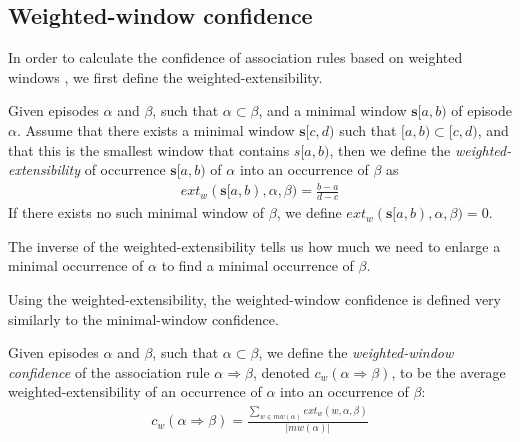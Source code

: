 \subsection{Weighted-window confidence}

In order to calculate the confidence of association rules based on weighted windows \citep{cule2014marbles}, we first define the weighted-extensibility.

\begin{definition} \label{def:weighted-extensibility}
Given episodes $ \alpha $ and $ \beta $, such that $ \alpha \subset \beta $, and a minimal window $ \boldsymbol{s}[a, b) $ of episode $ \alpha $. Assume that there exists a minimal window $ \boldsymbol{s}[c, d) $ such that $ [a, b) \subset [c, d) $, and that this is the smallest window that contains $ s[a, b) $, then we define the \emph{weighted-extensibility} of occurrence $ \boldsymbol{s}[a, b) $ of $ \alpha $ into an occurrence of $ \beta $ as
\begin{align*}
ext_w(\boldsymbol{s}[a, b), \alpha, \beta) = \frac{b - a}{d - c}
\end{align*}
If there exists no such minimal window of $ \beta $, we define $ ext_w(\boldsymbol{s}[a, b), \alpha, \beta) = 0 $.
\end{definition}

The inverse of the weighted-extensibility tells us how much we need to enlarge a minimal occurrence of $ \alpha $ to find a minimal occurrence of $ \beta $.

Using the weighted-extensibility, the weighted-window confidence is defined very similarly to the minimal-window confidence.

\begin{definition} \label{def:weighted-window-confidence}
Given episodes $ \alpha $ and $ \beta $, such that $ \alpha \subset \beta $, we define the \emph{weighted-window confidence} of the association rule $ \alpha \Rightarrow \beta $, denoted $ c_w(\alpha \Rightarrow \beta) $, to be the average weighted-extensibility of an occurrence of $ \alpha $ into an occurrence of $ \beta $:
\begin{align*}
c_w(\alpha \Rightarrow \beta) = \frac{\sum_{w \in mw(\alpha)} ext_w(w, \alpha, \beta)}{| mw(\alpha) |}
\end{align*}
\end{definition}
